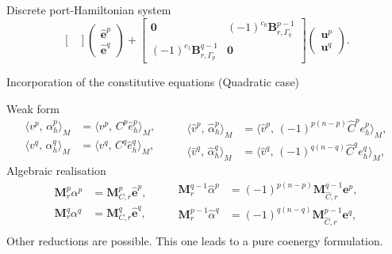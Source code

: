 \documentclass[aspectratio=169]{beamer}
\newcommand*{\dual}[1]{\ensuremath{\widehat{#1}}}
\newcommand{\inpr}[3][]{\ensuremath{\langle #2, \, #3 \rangle_{#1}}}
\begin{document}
\begin{frame}{Discrete port-Hamiltonian system}
\begin{equation*}
\begin{bmatrix}
	\end{bmatrix}
	\begin{pmatrix}
		\dual{\mathbf{e}}^p \\
		\dual{\mathbf{e}}^q
	\end{pmatrix} +
	\begin{bmatrix}
		\mathbf{0} & (-1)^{c_0}\mathbf{B}_{r, \Gamma_q}^{p-1} \\
		(-1)^{c_1}\mathbf{B}^{q-1}_{r, \Gamma_p} & \mathbf{0}
	\end{bmatrix}
	\begin{pmatrix}
		{\mathbf{u}}^p \\
		{\mathbf{u}}^q
	\end{pmatrix}. 
\end{equation*}
\end{frame}

\begin{frame}{Incorporation of the constitutive equations (Quadratic case)}

Weak form
\begin{equation*}
	\begin{aligned}
		\inpr[M]{{v}^p}{\alpha^p_h} &= \inpr[M]{{v}^p}{C^p \dual{e}^p_h}, \\
		\inpr[M]{{v}^q}{\alpha^q_h} &= \inpr[M]{{v}^q}{C^q \dual{e}^q_h}, \\ 
	\end{aligned} \qquad 
	\begin{aligned}
		\inpr[M]{\dual{v}^p}{\dual{\alpha}^p_h} &= \inpr[M]{\dual{v}^p}{(-1)^{p(n-p)}\dual{C}^p e^p_h}, \\
		\inpr[M]{\dual{v}^q}{\dual{\alpha}^q_h} &= \inpr[M]{\dual{v}^q}{(-1)^{q(n-q)} \dual{C}^q e^q_h},
	\end{aligned}
\end{equation*}
Algebraic realisation
\begin{equation*}
	\begin{aligned}
		\mathbf{M}_r^p {\alpha}^p &= \mathbf{M}_{C, r}^p \dual{\mathbf{e}}^p, \\
		\mathbf{M}_r^q {\alpha}^q &= \mathbf{M}_{C, r}^q \dual{\mathbf{e}}^q, \\
	\end{aligned} \qquad 
	\begin{aligned}
		\mathbf{M}_r^{q-1} \dual{{\alpha}}^p &= (-1)^{p(n-p)}\mathbf{M}_{\dual{C}, r}^{q-1} {\mathbf{e}}^p, \\
		\mathbf{M}_r^{p-1} \dual{{\alpha}}^q &= (-1)^{q(n-q)}\mathbf{M}_{\dual{C}, r}^{p-1} \mathbf{e}^q, \\
	\end{aligned}
\end{equation*}
Other reductions are possible. This one leads to a pure coenergy formulation.
\end{frame}
\end{document}
